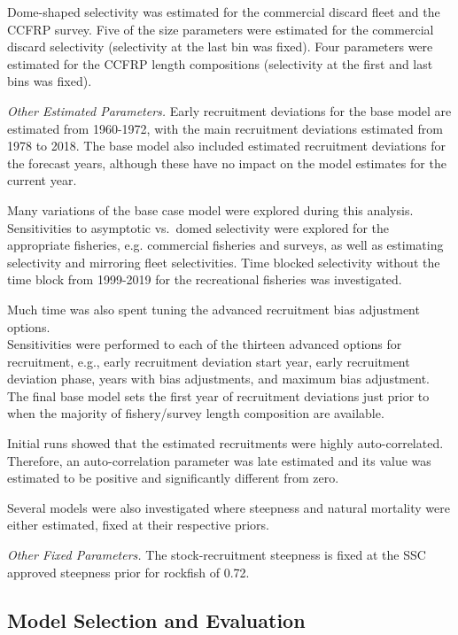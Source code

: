 \documentclass[12pt,]{article}
\begin{document}
Dome-shaped selectivity was estimated for the commercial discard fleet
and the CCFRP survey. Five of the size parameters were estimated for the
commercial discard selectivity (selectivity at the last bin was fixed).
Four parameters were estimated for the CCFRP length compositions
(selectivity at the first and last bins was fixed).

\emph{Other Estimated Parameters.} Early recruitment deviations for the
base model are estimated from 1960-1972, with the main recruitment
deviations estimated from 1978 to 2018. The base model also included
estimated recruitment deviations for the forecast years, although these
have no impact on the model estimates for the current year.

Many variations of the base case model were explored during this
analysis. Sensitivities to asymptotic vs.~domed selectivity were
explored for the appropriate fisheries, e.g. commercial fisheries and
surveys, as well as estimating selectivity and mirroring fleet
selectivities. Time blocked selectivity without the time block from
1999-2019 for the recreational fisheries was investigated.

Much time was also spent tuning the advanced recruitment bias adjustment
options.\\
Sensitivities were performed to each of the thirteen advanced options
for recruitment, e.g., early recruitment deviation start year, early
recruitment deviation phase, years with bias adjustments, and maximum
bias adjustment. The final base model sets the first year of recruitment
deviations just prior to when the majority of fishery/survey length
composition are available.

Initial runs showed that the estimated recruitments were highly
auto-correlated.\\
Therefore, an auto-correlation parameter was late estimated and its
value was estimated to be positive and significantly different from
zero.

Several models were also investigated where steepness and natural
mortality were either estimated, fixed at their respective priors.

\emph{Other Fixed Parameters.} The stock-recruitment steepness is fixed
at the SSC approved steepness prior for rockfish of 0.72.

\subsection{Model Selection and
Evaluation}\label{model-selection-and-evaluation}
\end{document}

